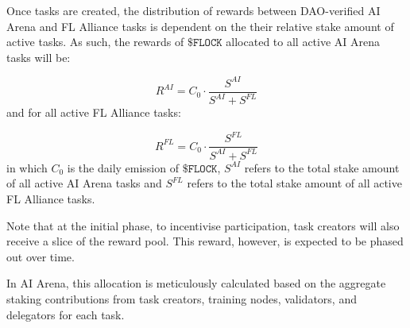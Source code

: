 \documentclass[conference]{IEEEtran}
\newcommand{\FL}{\ac{FL} Alliance\xspace}
\newcommand{\SNT}{{AI Arena}\xspace}
\newcommand{\FML}{\ensuremath{\xspace\texttt{\$FLOCK}}\xspace}
\begin{document}



Once tasks are created, the distribution of rewards between DAO-verified AI Arena and FL Alliance tasks is dependent on the their relative stake amount of active tasks. As such, the rewards of \FML allocated to all active AI Arena tasks will be:

$$R^{AI} = C_0 \cdot \frac{S^{AI}}{S^{AI} + S^{FL}}$$
and for all active FL Alliance tasks:

$$R^{FL} = C_0 \cdot \frac{S^{FL}}{S^{AI} + S^{FL}}$$
in which $C_0$ is the daily emission of \FML, $S^{AI}$ refers to the total stake amount of all active AI Arena tasks and $S^{FL}$ refers to the total stake amount of all active FL Alliance tasks. 

Note that at the initial phase, to incentivise participation, task creators will also receive a slice of the reward pool. This reward, however, is expected to be phased out over time. 

In \SNT, this allocation is meticulously calculated based on the aggregate staking contributions from task creators, training nodes, validators, and delegators for each task. 

\end{document}
